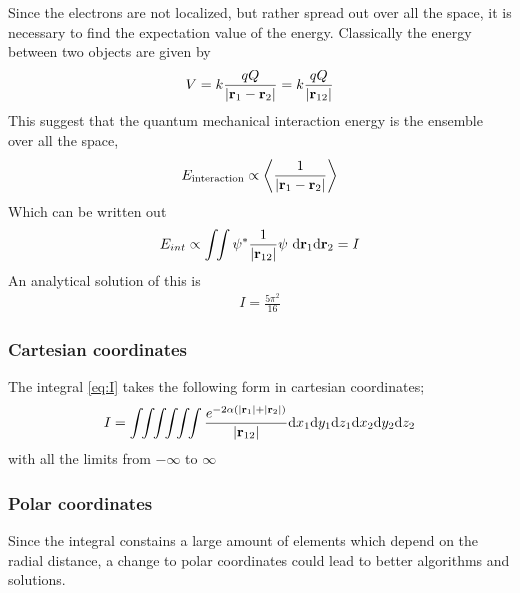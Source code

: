 \documentclass[11pt,a4paper,english,final]{article}
\numberwithin{equation}{section}
\newcommand{\conj}[1]{#1^*}
\newcommand{\ve}[1]{\mathbf{#1}} %
\newcommand{\di}{\mathrm{d}}
\begin{document}
Since the electrons are not localized, but rather spread out over all the 
space, it is necessary to find the expectation value of the energy. 
Classically the energy between two objects are given by
\begin{gather}
V = k\frac{qQ}{\abs{\ve{r}_1 - \ve{r}_2}} = k\frac{qQ}{\abs{\ve{r}_{12}}}
\end{gather}
This suggest that the quantum mechanical interaction energy is the 
ensemble over all the space,
\begin{gather}
E_{\text{interaction}} \propto  
\expval{\frac{1}{\abs{\ve{r}_1 - \ve{r}_2}}}
\end{gather}
Which can be written out 
\begin{gather}
E_{int} \propto \int\!\! \int \conj{\psi} 
\frac{1}{\abs{\ve{r}_{12}}} \psi 
\,\, \di\ve{r}_1\di\ve{r}_2 = I
\label{eq:I}
\end{gather}
An analytical solution of this is
\begin{gather}
I = \frac{5\pi^2}{16}
\end{gather}



\subsubsection{Cartesian coordinates}

The integral \eqref{eq:I} takes the following form in cartesian 
coordinates;
\begin{gather} I = 
\int\!\!\int\!\!\int\!\!\int\!\!\int\!\!\int
\frac{e^{-2\alpha\left(\abs{\ve{r}_1} + \abs{\ve{r}_2 }\right)}
}{\abs{\ve{r}_{12}}}
\di x_1\di y_1\di z_1\di x_2\di y_2\di z_2
\label{eq:Ecart}
\end{gather}
with all the limits from $-\infty$ to $\infty$


\subsubsection{Polar coordinates}
Since the integral constains a large amount of elements which depend 
on the radial distance, a change to polar coordinates could lead to 
better algorithms and solutions.
\end{document}
